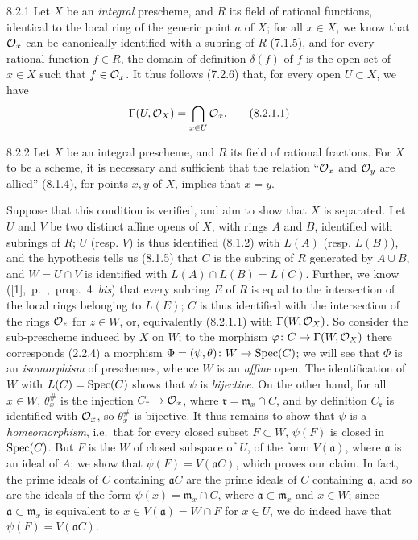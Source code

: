 \documentclass[../main.tex]{subfiles}
\begin{document}
\begin{cx}{8.2.1}
    Let $X$ be an \emph{integral} prescheme, and $R$ its field of rational functions, identical to the local ring of the generic point $a$ of $X$; for all $x\in X$, we know that $\mathcal{O}_x$ can be canonically identified with a subring of $R$ (7.1.5), and for every rational function $f\in R$, the domain of definition $\delta(f)$ of $f$ is the open set of $x\in X$ such that $f\in\mathcal{O}_x$.
    It thus follows (7.2.6) that, for every open $U\subset X$, we have
    \begin{equation*}
        \Gamma(U,\mathcal{O}_X) = \bigcap_{x\in U}\mathcal{O}_x.\tag{8.2.1.1}
    \end{equation*}
\end{cx}

\begin{cx}[Proposition]{8.2.2}
    Let $X$ be an integral prescheme, and $R$ its field of rational fractions.
    For $X$ to be a scheme, it is necessary and sufficient that the relation ``$\mathcal{O}_x$ and $\mathcal{O}_y$ are allied'' (8.1.4), for points $x,y$ of $X$, implies that $x=y$.
\end{cx}

Suppose that this condition is verified, and aim to show that $X$ is separated.
Let $U$ and $V$ be two distinct affine opens of $X$, with rings $A$ and $B$, identified with subrings of $R$; $U$ (resp. $V$) is thus identified (8.1.2) with $L(A)$ (resp. $L(B)$), and the hypothesis tells us (8.1.5) that $C$ is the subring of $R$ generated by $A\cup B$, and $W=U\cap V$ is identified with $L(A)\cap L(B)=L(C)$.
Further, we know ([1],~p.~,~prop.~4~\emph{bis}) that every subring $E$ of $R$ is equal to the intersection of the local rings belonging to $L(E)$; $C$ is thus identified with the intersection of the rings $\mathcal{O}_z$ for $z\in W$, or, equivalently (8.2.1.1) with $\Gamma(W,\mathcal{O}_X)$.
So consider the sub-prescheme induced by $X$ on $W$; to the  morphism $\varphi\colon C\to\Gamma(W,\mathcal{O}_X)$ there corresponds (2.2.4) a morphism $\Phi=(\psi,\theta)\colon W\to\operatorname*{Spec}(C)$; we will see that $\Phi$ is an \emph{isomorphism} of preschemes, whence $W$ is an \emph{affine} open.
The identification of $W$ with $L(C)=\operatorname*{Spec}(C)$ shows that $\psi$ is \emph{bijective}.
On the other hand, for all $x\in W$, $\theta_x^\#$ is the injection $C_\mathfrak{r}\to\mathcal{O}_x$, where $\mathfrak{r}=\mathfrak{m}_x\cap C$, and by definition $C_\mathfrak{r}$ is identified with $\mathcal{O}_x$, so $\theta_x^\#$ is bijective.
It thus remains to show that $\psi$ is a \emph{homeomorphism}, i.e.\ that for every closed subset $F\subset W$, $\psi(F)$ is closed in $\operatorname*{Spec}(C)$.
But $F$ is the  $W$ of closed subspace of $U$, of the form $V(\mathfrak{a})$, where $\mathfrak{a}$ is an ideal of $A$; we show that $\psi(F)=V(\mathfrak{a}C)$, which proves our claim.
In fact, the prime ideals of $C$ containing $\mathfrak{a}C$ are the prime ideals of $C$ containing $\mathfrak{a}$, and so are the ideals of the form $\psi(x)=\mathfrak{m}_x\cap C$, where $\mathfrak{a}\subset\mathfrak{m}_x$ and $x\in W$; since $\mathfrak{a}\subset\mathfrak{m}_x$ is equivalent to $x\in V(\mathfrak{a})=W\cap F$ for $x\in U$, we do indeed have that $\psi(F)=V(\mathfrak{a}C)$.
\end{document}
